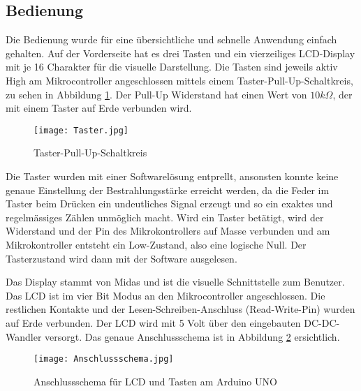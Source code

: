\subsection{Bedienung}
Die Bedienung wurde für eine übersichtliche und schnelle Anwendung einfach gehalten. Auf der Vorderseite hat es drei Tasten und ein vierzeiliges LCD-Display mit je 16 Charakter für die visuelle Darstellung. Die Tasten sind jeweils aktiv High am Mikrocontroller angeschlossen mittels einem Taster-Pull-Up-Schaltkreis, zu sehen in Abbildung \ref{fig:SwitchPullUp_Software}. Der Pull-Up Widerstand hat einen Wert von $10k\Omega$, der mit einem Taster auf Erde verbunden wird.

\begin{figure}[h]
	\centering
		\texttt{[image: Taster.jpg]}
	\caption{Taster-Pull-Up-Schaltkreis}
	\label{fig:SwitchPullUp_Software}
\end{figure}

Die Taster wurden mit einer Softwarelösung entprellt, ansonsten konnte keine genaue Einstellung der Bestrahlungsstärke erreicht werden, da die Feder im Taster beim Drücken ein undeutliches Signal erzeugt und so ein exaktes und regelmässiges Zählen unmöglich macht. Wird ein Taster betätigt, wird der Widerstand und der Pin des Mikrokontrollers auf Masse verbunden und am Mikrokontroller entsteht ein Low-Zustand, also eine logische Null. Der Tasterzustand wird dann mit der Software ausgelesen.

Das Display stammt von Midas und ist die visuelle Schnittstelle zum Benutzer. Das LCD ist im vier Bit Modus an den Mikrocontroller angeschlossen. Die restlichen Kontakte und der Lesen-Schreiben-Anschluss (Read-Write-Pin) wurden auf Erde verbunden. Der LCD wird mit 5 Volt über den eingebauten DC-DC-Wandler versorgt. Das genaue Anschlussschema  ist in Abbildung \ref{fig:AnschlussSchema} ersichtlich. 

\begin{figure}[h]
	\centering
		\texttt{[image: Anschlussschema.jpg]}
	\caption{Anschlussschema für LCD und Tasten am Arduino UNO}
	\label{fig:AnschlussSchema}
\end{figure}